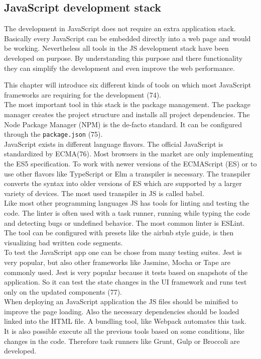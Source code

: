 \documentclass[american,a4paper,oneside,,tablecaptionabove]{scrbook}
\begin{document}
\subsection{JavaScript development
stack}\label{javascript-development-stack}

The development in JavaScript does not require an extra application
stack. Basically every JavaScript can be embedded directly into a web
page and would be working. Nevertheless all tools in the JS development
stack have been developed on purpose. By understanding this purpose and
there functionality they can simplify the development and even improve
the web performance.

This chapter will introduce six different kinds of tools on which most
JavaScript frameworks are requiring for the development (74).\\
The most important tool in this stack is the package management. The
package manager creates the project structure and installs all project
dependencies. The Node Package Manager (NPM) is the de-facto standard.
It can be configured through the \lstinline!package.json! (75).\\
JavaScript exists in different language flavors. The official JavaScript
is standardized by ECMA(76). Most browsers in the market are only
implementing the ES5 specification. To work with newer versions of the
ECMAScript (ES) or to use other flavors like TypeScript or Elm a
transpiler is necessary. The transpiler converts the syntax into older
versions of ES which are supported by a larger variety of devices. The
most used transpiler in JS is called babel.\\
Like most other programming languages JS has tools for linting and
testing the code. The linter is often used with a task runner, running
while typing the code and detecting bugs or undefined behavior. The most
common linter is ESLint. The tool can be configured with presets like
the airbnb style guide, is then visualizing bad written code segments.\\
To test the JavaScript app one can be chose from many testing suites.
Jest is very popular, but also other frameworks like Jasmine, Mocha or
Tape are commonly used. Jest is very popular because it tests based on
snapshots of the application. So it can test the state changes in the UI
framework and runs test only on the updated components (77).\\
When deploying an JavaScript application the JS files should be minified
to improve the page loading. Also the necessary dependencies should be
loaded linked into the HTML file. A bundling tool, like Webpack
automates this task.\\
It is also possible execute all the previous tools based on some
conditions, like changes in the code. Therefore task runners like Grunt,
Gulp or Broccoli are developed.
\end{document}
